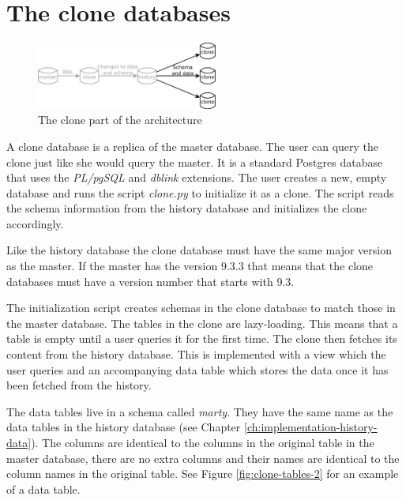 \section{The clone databases}
\label{ch:impementation-clones}

\begin{figure}
  \vspace{-20pt}
  \begin{center}
    \includegraphics[width=0.53\textwidth]{img/architecture-clones}
  \end{center}
  \vspace{-20pt}
  \caption{The clone part of the architecture}
  \vspace{-10pt}
\end{figure}

A clone database is a replica of the master database.
The user can query the clone just like she would query the master.
It is a standard Postgres database that uses the \textit{PL/pgSQL} and \textit{dblink} extensions.
The user creates a new, empty database and runs the script \textit{clone.py} to initialize it as a clone.
The script reads the schema information from the history database and initializes the clone accordingly.

Like the history database the clone database must have the same major version as the master.
If the master has the version 9.3.3 that means that the clone databases must have a version number that starts with 9.3.

The initialization script creates schemas in the clone database to match those in the master database.
The tables in the clone are lazy-loading.
This means that a table is empty until a user queries it for the first time.
The clone then fetches its content from the history database.
This is implemented with a view which the user queries and an accompanying data table which stores the data once it has been fetched from the history.

The data tables live in a schema called \textit{marty}.
They have the same name as the data tables in the history database (see Chapter \ref{ch:implementation-history-data}).
The columns are identical to the columns in the original table in the master database, there are no extra columns and their names are identical to the column names in the original table.
See Figure \ref{fig:clone-tables-2} for an example of a data table.

